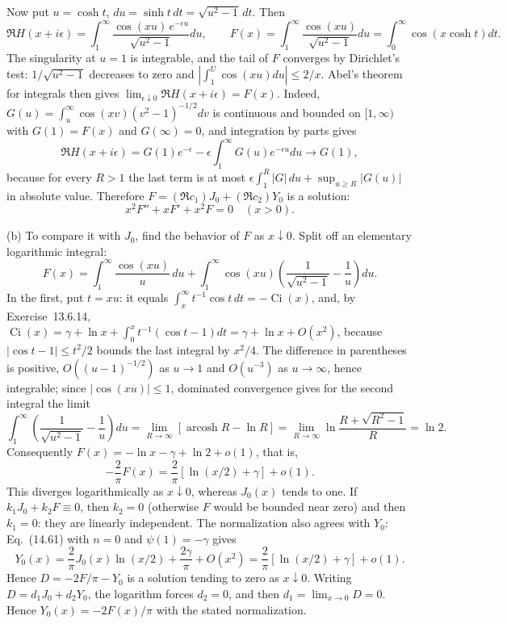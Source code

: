 Now put $u=\cosh t$, $du=\sinh t\,dt=\sqrt{u^2-1}\,dt$. Then
\[
\Re H(x+i\epsilon)=\int_1^\infty
\frac{\cos(xu)\,e^{-\epsilon u}}{\sqrt{u^2-1}}du,\qquad
F(x)=\int_1^\infty\frac{\cos(xu)}{\sqrt{u^2-1}}du
=\int_0^\infty\cos(x\cosh t)dt.
\]
The singularity at $u=1$ is integrable, and the tail of $F$
converges by Dirichlet's test: $1/\sqrt{u^2-1}$ decreases to zero
and $|\int_1^U\cos(xu)du|\le2/x$. Abel's theorem for integrals then
gives $\lim_{\epsilon\downarrow0}\Re H(x+i\epsilon)=F(x)$. Indeed,
$G(u)=\int_u^\infty\cos(xv)(v^2-1)^{-1/2}dv$ is continuous and
bounded on $[1,\infty)$ with $G(1)=F(x)$ and $G(\infty)=0$, and
integration by parts gives
\[
\Re H(x+i\epsilon)=G(1)e^{-\epsilon}
-\epsilon\int_1^\infty G(u)e^{-\epsilon u}du
\longrightarrow G(1),
\]
because for every $R>1$ the last term is at most
$\epsilon\int_1^R|G|\,du+\sup_{u\ge R}|G(u)|$ in absolute value.
Therefore $F=(\Re c_1)J_0+(\Re c_2)Y_0$ is a solution:
\[
\boxed{x^2F''+xF'+x^2F=0\quad(x>0)}.
\]

(b) To compare it with $J_0$, find the behavior of $F$ as
$x\downarrow0$. Split off an elementary logarithmic integral:
\[
F(x)=\int_1^\infty\frac{\cos(xu)}u\,du
+\int_1^\infty\cos(xu)
\left(\frac1{\sqrt{u^2-1}}-\frac1u\right)du.
\]
In the first, put $t=xu$: it equals
$\int_x^\infty t^{-1}\cos t\,dt=-\operatorname{Ci}(x)$, and, by
Exercise~13.6.14,
$\operatorname{Ci}(x)=\gamma+\ln x+\int_0^x t^{-1}(\cos t-1)dt
=\gamma+\ln x+O(x^2)$, because $|\cos t-1|\le t^2/2$ bounds the last
integral by $x^2/4$. The difference in parentheses is positive,
$O((u-1)^{-1/2})$ as $u\to1$ and $O(u^{-3})$ as $u\to\infty$, hence
integrable; since $|\cos(xu)|\le1$, dominated convergence gives for
the second integral the limit
\[
\int_1^\infty\!\left(\frac1{\sqrt{u^2-1}}-\frac1u\right)du
=\lim_{R\to\infty}[\operatorname{arcosh}R-\ln R]
=\lim_{R\to\infty}\ln\frac{R+\sqrt{R^2-1}}R=\ln2.
\]
Consequently $F(x)=-\ln x-\gamma+\ln2+o(1)$, that is,
\[
-\frac2\pi F(x)=\frac2\pi[\ln(x/2)+\gamma]+o(1).
\]
This diverges logarithmically as $x\downarrow0$, whereas $J_0(x)$
tends to one. If $k_1J_0+k_2F\equiv0$, then $k_2=0$ (otherwise $F$
would be bounded near zero) and then $k_1=0$: they are linearly
independent. The normalization also agrees with $Y_0$: Eq.~(14.61)
with $n=0$ and $\psi(1)=-\gamma$ gives
\[
Y_0(x)=\frac2\pi J_0(x)\ln(x/2)+\frac{2\gamma}\pi+O(x^2)
=\frac2\pi[\ln(x/2)+\gamma]+o(1).
\]
Hence $D=-2F/\pi-Y_0$ is a
solution tending to zero as $x\downarrow0$. Writing
$D=d_1J_0+d_2Y_0$, the logarithm forces $d_2=0$, and then
$d_1=\lim_{x\to0}D=0$. Hence
$Y_0(x)=-2F(x)/\pi$ with the stated normalization.

